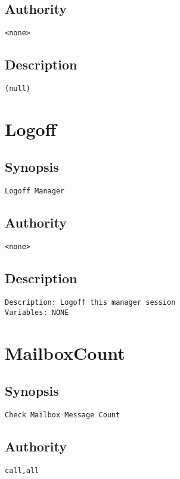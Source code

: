 \subsection{Authority}
\begin{verbatim}
<none>
\end{verbatim}
\subsection{Description}
\begin{verbatim}
(null)
\end{verbatim}


\section{Logoff}
\subsection{Synopsis}
\begin{verbatim}
Logoff Manager
\end{verbatim}
\subsection{Authority}
\begin{verbatim}
<none>
\end{verbatim}
\subsection{Description}
\begin{verbatim}
Description: Logoff this manager session
Variables: NONE

\end{verbatim}


\section{MailboxCount}
\subsection{Synopsis}
\begin{verbatim}
Check Mailbox Message Count
\end{verbatim}
\subsection{Authority}
\begin{verbatim}
call,all
\end{verbatim}

